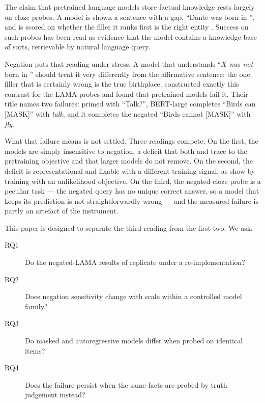 \documentclass{article}
\begin{document}
The claim that pretrained language models store factual knowledge rests largely on cloze probes. A
model is shown a sentence with a gap, ``Dante was born in \underline{\hspace{1em}}'', and is scored on
whether the filler it ranks first is the right entity \citep{petroni2019}. Success on such probes has
been read as evidence that the model contains a knowledge base of sorts, retrievable by natural
language query.

Negation puts that reading under stress. A model that understands ``$X$ was \emph{not} born in
\underline{\hspace{1em}}'' should treat it very differently from the affirmative sentence: the one
filler that is certainly wrong is the true birthplace. \citet{kassner2020} constructed exactly this
contrast for the LAMA probes and found that pretrained models fail it. Their title names two failures: primed with ``Talk?'', BERT-large completes ``Birds can [MASK]'' with \emph{talk}, and it completes the negated ``Birds cannot [MASK]'' with \emph{fly}.

What that failure means is not settled. Three readings compete. On the first, the models are simply
insensitive to negation, a deficit that both \citet{truong2023} and \citet{garciaferrero2023} trace to the pretraining objective and that larger models do not remove. On the second, the deficit is representational and fixable with
a different training signal, as \citet{hosseini2021} show by training with an unlikelihood objective.
On the third, the negated cloze probe is a peculiar task --- the negated query has no unique correct
answer, so a model that keeps its prediction is not straightforwardly wrong --- and the measured
failure is partly an artefact of the instrument.

This paper is designed to separate the third reading from the first two. We ask:

\begin{description}
  \item[RQ1] Do the negated-LAMA results of \citet{kassner2020} replicate under a re-implementation?
  \item[RQ2] Does negation sensitivity change with scale within a controlled model family?
  \item[RQ3] Do masked and autoregressive models differ when probed on identical items?
  \item[RQ4] Does the failure persist when the same facts are probed by truth judgement instead?
\end{description}
\end{document}
